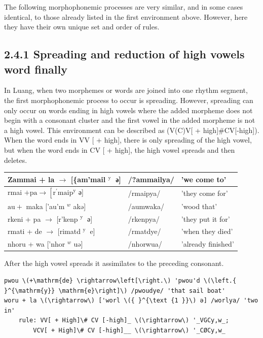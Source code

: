 \documentclass[10pt]{article}
\begin{document}
The following morphophonemic processes are very similar, and in some cases identical, to those already listed in the first environment above. However, here they have their own unique set and order of rules.

\subsection*{2.4.1 Spreading and reduction of high vowels word finally}
In Luang, when two morphemes or words are joined into one rhythm segment, the first morphophonemic process to occur is spreading. However, spreading can only occur on words ending in high vowels where the added morpheme does not begin with a consonant cluster and the first vowel in the added morpheme is not a high vowel. This environment can be described as (V(C)V[ + high]\#CV[-high]). When the word ends in VV [ + high], there is only spreading of the high vowel, but when the word ends in CV [ + high], the high vowel spreads and then deletes.

\begin{center}
\begin{tabular}{|l|l|l|}
\hline
Zammai + la \(\rightarrow\) [\{am'mail \({ }^{\text {y }}\) ә] & /?ammailya/ & 'we come to' \\
\hline
rmai \(+\mathrm{pa} \rightarrow\left[\mathrm{r}^{\prime} \mathrm{maip}^{\mathrm{y}}\right.\) ә] & /rmaipya/ & 'they come for' \\
\hline
\(\mathrm{au}+\) maka ['au'm \({ }^{w}\) akə] & /aumwaka/ & 'wood that' \\
\hline
rkeni + pa \(\rightarrow\) [r'kenp \({ }^{\text {y }}\) ә] & /rkenpya/ & 'they put it for' \\
\hline
rmati + de \(\rightarrow\) [rimatd \({ }^{\text {y }}\) e] & /rmatdye/ & 'when they died' \\
\hline
nhoru + wa ['nhor \({ }^{w}\) uə] & /nhorwua/ & 'already finished' \\
\hline
\end{tabular}
\end{center}

After the high vowel spreads it assimilates to the preceding consonant.

\begin{verbatim}
pwou \(+\mathrm{de} \rightarrow\left[\right.\) 'pwou'd \(\left.{ }^{\mathrm{y}} \mathrm{e}\right]\) /pwoudye/ 'that sail boat'
woru + la \(\rightarrow\) ['worl \({ }^{\text {1 }}\) ә] /worlya/ 'two in'
    rule: VV[ + High]\# CV [-high]_ \(\rightarrow\) '_VGCy,w_;
        VCV[ + High]\# CV [-high]__ \(\rightarrow\) '_CØСу,w_
\end{verbatim}
\end{document}

